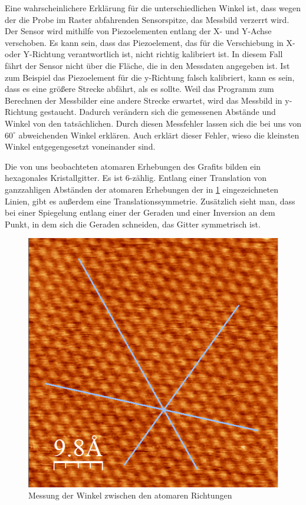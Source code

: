 \documentclass[10pt,a4paper]{article}
\begin{document}
Eine wahrscheinlichere Erklärung für die unterschiedlichen Winkel ist, dass wegen der die Probe im Raster abfahrenden Sensorspitze, das Messbild verzerrt wird. Der Sensor wird mithilfe von Piezoelementen entlang der X- und Y-Achse verschoben. Es kann sein, dass das Piezoelement, das für die Verschiebung in X- oder Y-Richtung verantwortlich ist, nicht richtig kalibriert ist. In diesem Fall fährt der Sensor nicht über die Fläche, die in den Messdaten angegeben ist. Ist zum Beispiel das Piezoelement für die y-Richtung falsch kalibriert, kann es sein, dass es eine größere Strecke abfährt, als es sollte. Weil das Programm zum Berechnen der Messbilder eine andere Strecke erwartet, wird das Messbild in y-Richtung gestaucht. Dadurch verändern sich die gemessenen Abstände und Winkel von den tatsächlichen. Durch diesen Messfehler lassen sich die bei uns von $60^\circ$ abweichenden Winkel erklären. Auch erklärt dieser Fehler, wieso die kleinsten Winkel entgegengesetzt voneinander sind.

Die von uns beobachteten atomaren Erhebungen des Grafits bilden ein hexagonales Kristallgitter. Es ist 6-zählig. Entlang einer Translation von ganzzahligen Abständen der atomaren Erhebungen der in \ref{Messungerh6} eingezeichneten Linien, gibt es außerdem eine Translationssymmetrie. Zusätzlich sieht man, dass bei einer Spiegelung entlang einer der Geraden und einer Inversion an dem Punkt, in dem sich die Geraden schneiden, das Gitter symmetrisch ist.

\begin{figure}[h]
	\centering
	
	\includegraphics[scale = 0.7]{Winkelmessung_kristall.png}
	
	\caption{Messung der Winkel zwischen den atomaren Richtungen}
	\label{Messungerh6}
\end{figure}
\end{document}

